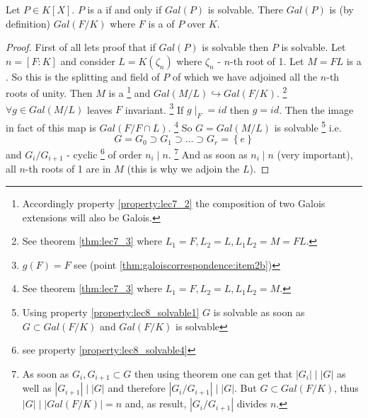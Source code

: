 \begin{theorem}
  Let $P \in K\left[X\right]$. $P$ is a
   if and only if
  $Gal\left(P\right)$ is solvable. There
  $Gal\left(P\right)$ is (by definition) $Gal\left(F/K\right)$ where
  $F$ is a  of $P$ over $K$.
  \begin{proof}
    First of all lets proof that if $Gal\left(P\right)$ is solvable
    then $P$ is solvable. Let $n = \left[F:K\right]$ and consider
    $L = K\left(\zeta_n\right)$ where $\zeta_n$ - $n$-th root of 1.
    Let $M = FL$ is a . So this is the
    splitting and field of $P$ of which we have adjoined all the
    $n$-th roots of unity.  Then $M$ is a
    \footnote{
      Accordingly property \ref{property:lec7_2} the composition of
      two Galois extensions will also be Galois.
    }
    and
    $Gal\left(M/L\right) \hookrightarrow Gal\left(F/K\right)$.
    \footnote{
      See theorem \ref{thm:lec7_3} where $L_1 = F, L_2 = L, L_1 L_2 =
      M = FL$.
    }
    $\forall g \in Gal\left(M/L\right)$ leaves $F$ invariant.
    \footnote{
      $g(F) = F$ see  (point
      \ref{thm:galoiscorrespondence:item2b}) 
    }
    If $g\mid_F = id$ then $g = id$. Then the image in fact of this
    map is $Gal\left(F/F \cap L\right)$.
    \footnote{
      See theorem \ref{thm:lec7_3} where $L_1 = F, L_2 = L, L_1 L_2 =
      M$.
    }    
    So $G = Gal\left(M/L\right)$
    is solvable
    \footnote{
      Using property \ref{property:lec8_solvable1} $G$ is solvable as
      soon as $G \subset Gal\left(F/K\right)$ and 
      $Gal\left(F/K\right)$ is solvable
    }
    i.e. 
    \[
    G = G_0 \supset G_1 \supset \dots \supset G_r = \left\{e\right\}
    \]
    and $G_i/G_{i+1}$ - cyclic
    \footnote{
      see property \ref{property:lec8_solvable4}
    }
    of order $n_i \mid n$.
    \footnote{
      As soon as $G_i, G_{i+1} \subset G$ then using
       theorem one can get that
      $\left|G_i\right| \mid \left|G\right|$ as well as
      $\left|G_{i+1}\right| \mid \left|G\right|$ and therefore
      $\left|G_i/G_{i+1}\right| \mid \left|G\right|$. But
      $G \subset Gal\left(F/K\right)$, thus
      $\left|G\right| \mid \left|Gal\left(F/K\right)\right| = n$ and, as
      result, $\left|G_i/G_{i+1}\right|$ divides $n$.
    }
    And as soon as
    $n_i \mid n$ (very important), all $n$-th roots of 1 are in $M$
    (this is why we adjoin the $L$).


\end{proof}
\end{theorem}
